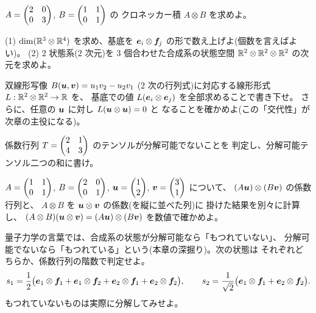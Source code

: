 \begin{mondai}[基本]\label{q:tensor-ex3}
$A = \begin{pmatrix}2 & 0 \\ 0 & 3\end{pmatrix}$, $B = \begin{pmatrix}1 & 1 \\ 0 & 1\end{pmatrix}$ の
クロネッカー積 $A \otimes B$ を求めよ。
\end{mondai}

\begin{mondai}[基本]\label{q:tensor-ex4}
(1) $\dim(\mathbb{R}^3 \otimes \mathbb{R}^4)$ を求め、基底を
$\bm{e}_i \otimes \bm{f}_j$ の形で数え上げよ(個数を言えばよい)。
(2) $2$ 状態系($2$ 次元)を $3$ 個合わせた合成系の状態空間
$\mathbb{R}^2 \otimes \mathbb{R}^2 \otimes \mathbb{R}^2$ の次元を求めよ。
\end{mondai}

\begin{mondai}[標準]\label{q:tensor-ex5}
双線形写像 $B(\bm{u}, \bm{v}) = u_1 v_2 - u_2 v_1$
($2$ 次の行列式)に対応する線形形式 $L : \mathbb{R}^2 \otimes \mathbb{R}^2 \to \mathbb{R}$ を、
基底での値 $L(\bm{e}_i \otimes \bm{e}_j)$ を全部求めることで書き下せ。
さらに、任意の $\bm{u}$ に対し $L(\bm{u} \otimes \bm{u}) = 0$ と
なることを確かめよ(この「交代性」が次章の主役になる)。
\end{mondai}

\begin{mondai}[標準]\label{q:tensor-ex6}
係数行列 $T = \begin{pmatrix}2 & 1 \\ 4 & 3\end{pmatrix}$ のテンソルが分解可能でないことを
判定し、分解可能テンソル二つの和に書け。
\end{mondai}

\begin{mondai}[標準]\label{q:tensor-ex7}
$A = \begin{pmatrix}1 & 1 \\ 0 & 1\end{pmatrix}$, $B = \begin{pmatrix}2 & 0 \\ 0 & 1\end{pmatrix}$,
$\bm{u} = \begin{pmatrix}1 \\ 2\end{pmatrix}$, $\bm{v} = \begin{pmatrix}3 \\ 1\end{pmatrix}$ について、
$(A\bm{u}) \otimes (B\bm{v})$ の係数行列と、
$A \otimes B$ を $\bm{u} \otimes \bm{v}$ の係数(を縦に並べた列)に
掛けた結果を別々に計算し、
$(A \otimes B)(\bm{u} \otimes \bm{v}) = (A\bm{u}) \otimes (B\bm{v})$
を数値で確かめよ。
\end{mondai}

\begin{mondai}[標準]\label{q:tensor-ex8}
量子力学の言葉では、合成系の状態が分解可能なら「もつれていない」、
分解可能でないなら「もつれている」という(本章の深掘り)。次の状態は
それぞれどちらか、係数行列の階数で判定せよ。
\[
s_1 = \frac{1}{2}\bigl(\bm{e}_1 \otimes \bm{f}_1
+ \bm{e}_1 \otimes \bm{f}_2 + \bm{e}_2 \otimes \bm{f}_1
+ \bm{e}_2 \otimes \bm{f}_2\bigr), \qquad
s_2 = \frac{1}{\sqrt{2}}\bigl(\bm{e}_1 \otimes \bm{f}_1
+ \bm{e}_2 \otimes \bm{f}_2\bigr).
\]
もつれていないものは実際に分解してみせよ。
\end{mondai}

